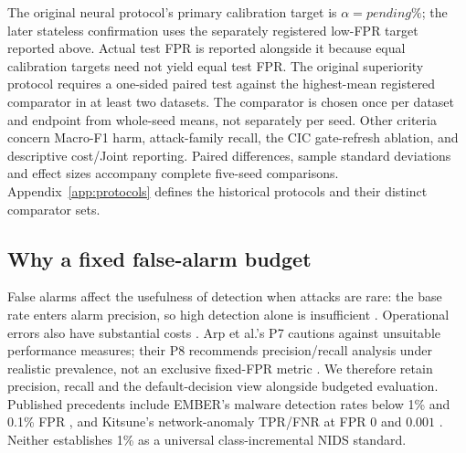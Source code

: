 \documentclass[10pt,twocolumn]{article}
\newcommand{\pending}{\textit{pending}}
\providecommand{\PrimaryAlpha}{\pending}
\begin{document}
The original neural protocol's primary calibration target is $\alpha=\PrimaryAlpha\%$; the later stateless confirmation uses the separately registered low-FPR target reported above. Actual test FPR is reported alongside it because equal calibration targets need not yield equal test FPR. The original superiority protocol requires a one-sided paired test against the highest-mean registered comparator in at least two datasets. The comparator is chosen once per dataset and endpoint from whole-seed means, not separately per seed. Other criteria concern Macro-F1 harm, attack-family recall, the CIC gate-refresh ablation, and descriptive cost/Joint reporting. Paired differences, sample standard deviations and effect sizes accompany complete five-seed comparisons. Appendix~\ref{app:protocols} defines the historical protocols and their distinct comparator sets.

\subsection{Why a fixed false-alarm budget}
False alarms affect the usefulness of detection when attacks are rare: the base rate enters alarm precision, so high detection alone is insufficient \cite{axelsson2000base}. Operational errors also have substantial costs \cite{sommer2010outside}. Arp et al.'s P7 cautions against unsuitable performance measures; their P8 recommends precision/recall analysis under realistic prevalence, not an exclusive fixed-FPR metric \cite{arp2022dos}. We therefore retain precision, recall and the default-decision view alongside budgeted evaluation. Published precedents include EMBER's malware detection rates below 1\% and 0.1\% FPR \cite{anderson2018ember}, and Kitsune's network-anomaly TPR/FNR at FPR $0$ and $0.001$ \cite{mirsky2018kitsune}. Neither establishes 1\% as a universal class-incremental NIDS standard.
\end{document}
